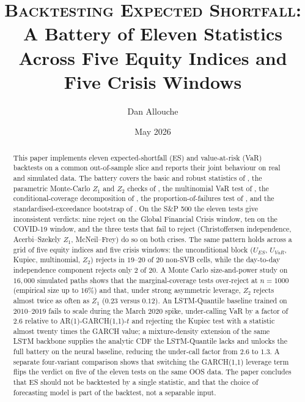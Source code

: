\documentclass[11pt,a4paper]{article}
\title{
  \vspace{-2em}
  \Large \textsc{Backtesting Expected Shortfall:} \\[0.2em]
  \LARGE A Battery of Eleven Statistics \\
  Across Five Equity Indices and Five Crisis Windows
}
\author{Dan Allouche}
\date{May 2026}
\theoremstyle{plain}
\begin{document}
\maketitle

\begin{abstract}
\noindent
This paper implements eleven expected-shortfall (ES) and value-at-risk
(VaR) backtests on a common out-of-sample slice and reports their
joint behaviour on real and simulated data. The battery covers the
basic and robust statistics of \citet{du_escanciano_2017}, the
parametric Monte-Carlo $Z_1$ and $Z_2$ checks of
\citet{acerbi_szekely_2014}, the multinomial VaR test of
\citet{kratz_lok_mcneil_2018}, the conditional-coverage decomposition
of \citet{christoffersen_1998}, the proportion-of-failures test of
\citet{kupiec_1995}, and the standardised-exceedance bootstrap of
\citet{mcneil_frey_2000}. On the S\&P 500 the eleven tests give
inconsistent verdicts: nine reject on the Global Financial Crisis
window, ten on the COVID-19 window, and the three tests that fail to
reject (Christoffersen independence, Acerbi--Szekely $Z_1$,
McNeil--Frey) do so on both crises. The same pattern holds across a
grid of five equity indices and five crisis windows: the unconditional
block ($U_{ES}$, $U_{VaR}$, Kupiec, multinomial, $Z_2$) rejects in
$19$--$20$ of $20$ non-SVB cells, while the day-to-day independence
component rejects only $2$ of $20$. A Monte Carlo size-and-power study
on $16{,}000$ simulated paths shows that the marginal-coverage tests
over-reject at $n=1000$ (empirical size up to $16\%$) and that, under
strong asymmetric leverage, $Z_2$ rejects almost twice as often as
$Z_1$ ($0.23$ versus $0.12$). An LSTM-Quantile baseline trained on
$2010$--$2019$ fails to scale during the March 2020 spike, under-calling
VaR by a factor of $2.6$ relative to AR(1)-GARCH(1,1)-$t$ and rejecting
the Kupiec test with a statistic almost twenty times the GARCH value;
a mixture-density extension of the same LSTM backbone supplies the
analytic CDF the LSTM-Quantile lacks and unlocks the full battery on
the neural baseline, reducing the under-call factor from $2.6$ to
$1.3$. A separate four-variant comparison shows that switching the
GARCH(1,1) leverage term flips the verdict on five of the eleven
tests on the same OOS data. The paper concludes that ES should not
be backtested by a single statistic, and that the choice of
forecasting model is part of the backtest, not a separable input.
\end{abstract}

\thispagestyle{empty}
\newpage
{}
\setcounter{page}{2}
\end{document}
